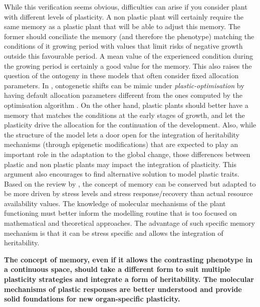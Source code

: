 While this verification seems obvious, difficulties can arise if you consider plant with different levels of plasticity. A non plastic plant will certainly require the same memory as a plastic plant that will be able to adjust this memory. The former should conciliate the memory (and therefore the phenotype) matching the conditions of it growing period with values that limit risks of negative growth outside this favourable period. A mean value of the experienced condition during the growing period is certainly a good value for the memory. This also raises the question of the ontogeny in these models that often consider fixed allocation parameters. In \model , ontogenetic shifts can be mimic under \textit{plastic-optimisation} by having default allocation parameters different from the ones computed by the optimisation algorithm . On the other hand, plastic plants should better have a memory that matches the conditions at the early stages of growth, and let the plasticity drive the allocation for the continuation of the development. Also, while the structure of the model lets a door open for the integration of heritability mechanisms (through epigenetic modifications) that are expected to play an important role in the adaptation to the global change, those differences between plastic and non plastic plants may impact the integration of plasticity. This argument also encourages to find alternative solution to model plastic traits. Based on the review by \cite{crisp_reconsidering_2016}, the concept of memory can be conserved but adapted to be more driven by stress levels and stress response/recovery than actual resource availability values. The knowledge of molecular mechanisms of the plant functioning must better inform the modelling routine that is too focused on mathematical and theoretical approaches. The advantage of such specific memory mechanism is that it can be stress specific  and allows the integration of heritability.

\textbf{The concept of memory, even if it allows the contrasting phenotype in a continuous space, should take a different form to suit multiple plasticity strategies and integrate a form of heritability. The molecular mechanisms of plastic responses are better understood and provide solid foundations for new organ-specific plasticity.}

